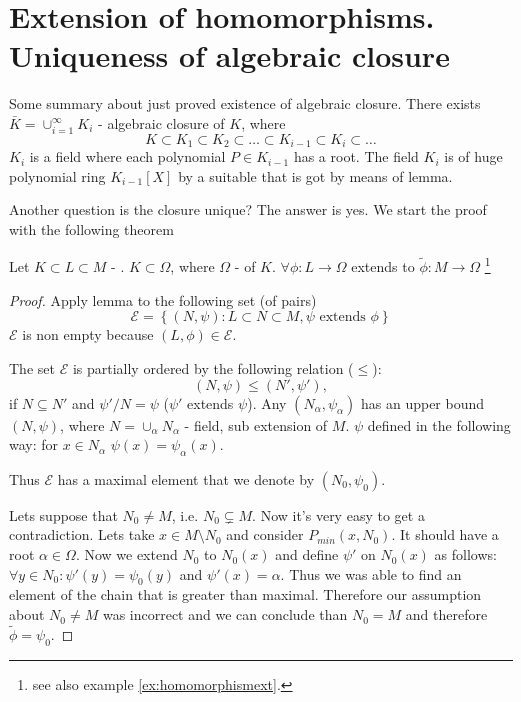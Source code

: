 \section{Extension of homomorphisms. Uniqueness of algebraic closure}

Some summary about just proved existence of algebraic closure. There
exists $\bar{K} = \cup_{i=1}^\infty K_i$ - algebraic closure of $K$,
where
\[
K \subset K_1 \subset K_2 \subset \dots \subset K_{i-1} \subset K_i
\subset \dots
\]
$K_i$ is a field where each polynomial $P \in K_{i-1}$ has a root. The
field $K_i$ is  of huge polynomial ring
$K_{i-1}\left[X\right]$ by a suitable  that is
got by means of  lemma.

Another question is the closure unique? The answer is yes. We start
the proof with the following theorem 

\begin{theorem}
  Let $K \subset L \subset M$ - .
  $K \subset \Omega$, where $\Omega$ - 
  of $K$.
  $\forall \phi: L \to \Omega$ extends to $\widetilde{\phi}: M \to
  \Omega$
  \footnote{
    see also example \ref{ex:homomorphismext}.
  }
  \begin{proof}
    Apply  lemma to the following set (of pairs)
    \[
    \mathcal{E} = \left\{
    \left(N, \psi\right): L \subset N \subset M, \psi \mbox{ extends }
    \phi 
    \right\}
    \]
    $\mathcal{E}$ is non empty because $\left(L,\phi\right) \in
    \mathcal{E}$.

    The set $\mathcal{E}$ is partially ordered by the following
    relation ($\le$):
    \[
    \left(N, \psi\right) \le \left(N', \psi'\right),
    \]
    if $N \subseteq N'$ and $\psi'/N = \psi$ ($\psi'$ extends $\psi$).
    Any  $\left(N_\alpha, \psi_\alpha\right)$
    has an upper bound $\left(N, \psi\right)$, where
    \(
    N = \cup_\alpha N_\alpha
    \) - field, sub extension of $M$. $\psi$ defined in the following
    way: for $x \in N_\alpha$ $\psi(x) = \psi_\alpha(x)$.

    Thus $\mathcal{E}$ has a maximal element that we denote by
    $\left(N_0, \psi_0\right)$.

    Lets suppose that $N_0 \ne M$, i.e.
    $N_0 \subsetneq M$. Now it's very easy to get a
    contradiction. Lets take $x \in M \setminus N_0$ and consider
     $P_{min}\left(x, N_0\right)$. It
    should have a root $\alpha \in \Omega$. Now we extend $N_0$ to
    $N_0\left(x\right)$ and define $\psi'$ on
    $N_0\left(x\right)$ as follows: $\forall y \in N_0: \psi'(y)
    = \psi_0(y)$ and $\psi'(x) = \alpha$. Thus we was able to find an
    element of the chain that is greater than maximal. Therefore our
    assumption about $N_0 \ne M$ was incorrect and we can conclude
    than $N_0 = M$ and therefore $\tilde{\phi} = \psi_0$. 
  \end{proof}
  \label{thm:lec2_3}
\end{theorem}

